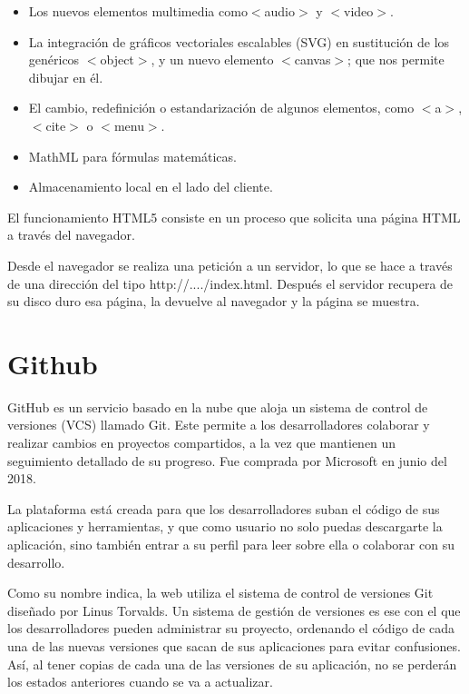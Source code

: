 \documentclass[a4paper, 12pt]{book}
\begin{document}
\begin{itemize}
    \item Los nuevos elementos multimedia como$<$audio$>$ y $<$video$>$.
    
    \item La integración de gráficos vectoriales escalables (SVG) en sustitución de los genéricos $<$object$>$, y un nuevo elemento $<$canvas$>$; que nos permite dibujar en él.

    \item El cambio, redefinición o estandarización de algunos elementos, como $<$a$>$, $<$cite$>$ o $<$menu$>$.
    
    \item MathML para fórmulas matemáticas.
    
    \item Almacenamiento local en el lado del cliente.
    \newline
\end{itemize}

El funcionamiento HTML5 consiste en un proceso que solicita una página HTML a través del navegador.

Desde el navegador se realiza una petición a un servidor, lo que se hace a través de una dirección del tipo http://..../index.html. Después el servidor recupera de su disco duro esa página, la devuelve al navegador y la página se muestra.

\newpage
\section{Github} 
\label{sec:Github_info}

GitHub es un servicio basado en la nube que aloja un sistema de control de versiones (VCS) llamado Git. Este permite a los desarrolladores colaborar y realizar cambios en proyectos compartidos, a la vez que mantienen un seguimiento detallado de su progreso. Fue comprada por Microsoft en junio del 2018. 

La plataforma está creada para que los desarrolladores suban el código de sus aplicaciones y herramientas, y que como usuario no solo puedas descargarte la aplicación, sino también entrar a su perfil para leer sobre ella o colaborar con su desarrollo.

Como su nombre indica, la web utiliza el sistema de control de versiones Git diseñado por Linus Torvalds. Un sistema de gestión de versiones es ese con el que los desarrolladores pueden administrar su proyecto, ordenando el código de cada una de las nuevas versiones que sacan de sus aplicaciones para evitar confusiones. Así, al tener copias de cada una de las versiones de su aplicación, no se perderán los estados anteriores cuando se va a actualizar.
\end{document}
